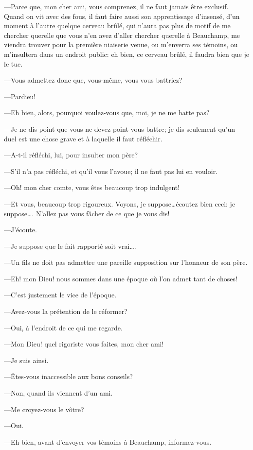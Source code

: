 —Parce que, mon cher ami, vous comprenez, il ne faut jamais être exclusif. Quand on vit avec des fous, il faut faire aussi son apprentissage d'insensé, d'un moment à l'autre quelque cerveau brûlé, qui n'aura pas plus de motif de me chercher querelle que vous n'en avez d'aller chercher querelle à Beauchamp, me viendra trouver pour la première niaiserie venue, ou m'enverra ses témoins, ou m'insultera dans un endroit public: eh bien, ce cerveau brûlé, il faudra bien que je le tue. 

—Vous admettez donc que, vous-même, vous vous battriez? 

—Pardieu! 

—Eh bien, alors, pourquoi voulez-vous que, moi, je ne me batte pas? 

—Je ne dis point que vous ne devez point vous battre; je dis seulement qu'un duel est une chose grave et à laquelle il faut réfléchir. 

—A-t-il réfléchi, lui, pour insulter mon père? 

—S'il n'a pas réfléchi, et qu'il vous l'avoue; il ne faut pas lui en vouloir. 

—Oh! mon cher comte, vous êtes beaucoup trop indulgent! 

—Et vous, beaucoup trop rigoureux. Voyons, je suppose\dots écoutez bien ceci: je suppose\dots. N'allez pas vous fâcher de ce que je vous dis! 

—J'écoute. 

—Je suppose que le fait rapporté soit vrai\dots. 

—Un fils ne doit pas admettre une pareille supposition sur l'honneur de son père. 

—Eh! mon Dieu! nous sommes dans une époque où l'on admet tant de choses! 

—C'est justement le vice de l'époque. 

—Avez-vous la prétention de le réformer? 

—Oui, à l'endroit de ce qui me regarde. 

—Mon Dieu! quel rigoriste vous faites, mon cher ami! 

—Je suis ainsi. 

—Êtes-vous inaccessible aux bons conseils? 

—Non, quand ils viennent d'un ami. 

—Me croyez-vous le vôtre? 

—Oui. 

—Eh bien, avant d'envoyer vos témoins à Beauchamp, informez-vous. 

